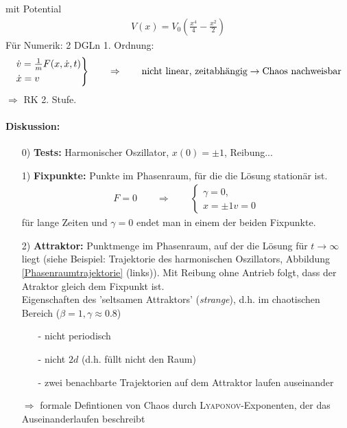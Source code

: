 \documentclass[12pt]{article}
\begin{document}
mit Potential
\begin{align*}
V(x) = V_0 ( \frac{x^4}{4} - \frac{x^2}{2})
\end{align*}
Für Numerik: 2 DGLn 1. Ordnung:
\begin{align*}
\begin{rcases}
\dot{v}= \frac{1}{m} F(x, \dot{x}, t) \\
\dot{x}= v
\end{rcases} \qquad \Rightarrow \qquad \text{nicht linear, zeitabhängig} \to \text{Chaos nachweisbar}
\end{align*}
$\Rightarrow$ RK 2. Stufe. \\



\paragraph{Diskussion:} 
\begin{enumerate}
\item[0)] \textbf{Tests:} Harmonischer Oszillator, $x(0) = \pm 1$, Reibung...
\item[1)] \textbf{Fixpunkte:} Punkte im Phasenraum, für die die Lösung stationär ist. 
\begin{align*}
F=0 \qquad \Rightarrow \qquad
\begin{cases}
\gamma =0, \\
 x = \pm 1
 v=0
\end{cases} 
\end{align*}
für lange Zeiten und $\gamma =0$ endet man in einem der beiden Fixpunkte.
\item[2)] \textbf{Attraktor:} Punktmenge im Phasenraum, auf der die Lösung für $t \to \infty$ liegt (siehe Beispiel: Trajektorie des harmonischen Oszillators, Abbildung \ref{Phasenraumtrajektorie} (links)). Mit Reibung ohne Antrieb folgt, dass der Atraktor gleich dem Fixpunkt ist. \\
Eigenschaften des 'seltsamen Attraktors' (\textit{strange}), d.h. im chaotischen Bereich ($\beta =1, \gamma \approx 0.8$)
\begin{itemize}
\item[-]nicht periodisch
\item[-]nicht $2d$ (d.h. füllt nicht den Raum)
\item[-]zwei benachbarte Trajektorien auf dem Attraktor laufen auseinander
\end{itemize}
$\Rightarrow$ formale Defintionen von Chaos durch \textsc{Lyaponov}-Exponenten, der das Auseinanderlaufen beschreibt
\end{enumerate}
\end{document}
